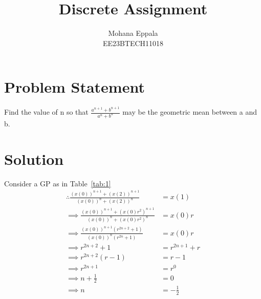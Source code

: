\documentclass[12pt]{article}
\newcommand{\tabref}[1]{Table~\ref{#1}}
\begin{document}
\title{Discrete Assignment}
\author{Mohana Eppala\\ EE23BTECH11018}
\maketitle

\section*{Problem Statement}
Find the value of n so that $\frac{a^{n+1} + b^{n+1}}{a^{n}+b^{n}}$ may be the geometric mean between a and b.
\section{Solution}

\begin{table}[H]

\end{table}

Consider a GP as in \tabref{tab:1}
\begin{align}
	\therefore \frac{(x(0))^{n+1} + (x(2))^{n+1}}{(x(0))^{n}+(x(2))^{n}} &= x(1) \\
	\implies \frac{(x(0))^{n+1} + (x(0)r^{2})^{n+1}}{(x(0))^{n} + (x(0)r^{2})^{n}} &= x(0)r \\
	\implies \frac{(x(0))^{n+1}(r^{2n+2} + 1)}{(x(0))^{n}(r^{2n}+1)} &= x(0)r \\
	\implies r^{2n+2} + 1 &= r^{2n+1} + r \\
	\implies r^{2n+2}(r-1) &= r - 1 \\
	\implies r^{2n+1} &= r^{0} \\
\implies n + \frac{1}{2} &= 0 \\
\implies n &= -\frac{1}{2}
\end{align}
\end{document}
